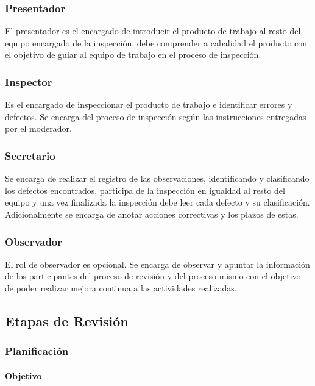 \subsubsection{Presentador}

El presentador es el encargado de introducir el producto de trabajo al resto del equipo encargado de la inspección, debe comprender a cabalidad el producto con el objetivo de guiar al equipo de trabajo en el proceso de inspección. 

\subsubsection{Inspector}

Es el encargado de inspeccionar el producto de trabajo e identificar errores y defectos. Se encarga del proceso de inspección según las instrucciones entregadas por el moderador. 

\subsubsection{Secretario}

Se encarga de realizar el registro de las observaciones, identificando y clasificando los defectos encontrados, participa de la inspección en igualdad al resto del equipo y una vez finalizada la inspección debe leer cada defecto y su clasificación. Adicionalmente se encarga de anotar acciones correctivas y los plazos de estas. 

\subsubsection{Observador}

El rol de observador es opcional. Se encarga de observar y apuntar la información de los participantes del proceso de revisión y del proceso mismo con el objetivo de poder realizar mejora continua a las actividades realizadas. 

\subsection{Etapas de Revisión}

\subsubsection{Planificación}

\paragraph{Objetivo\\}

